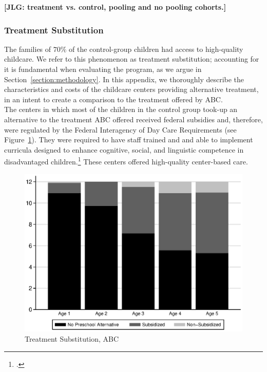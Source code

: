 \noindent \textbf{[JLG: treatment vs. control, pooling and no pooling cohorts.]}\\

\subsubsection{Treatment Substitution}

\noindent The families of $70\%$ of the control-group children had access to high-quality childcare. We refer to this phenomenon as treatment substitution; accounting for it is fundamental when evaluating the program, as we argue in Section~\ref{section:methodology}. In this appendix, we thoroughly describe the characteristics and costs of the childcare centers providing alternative treatment, in an intent to create a comparison to the treatment offered by ABC.\\

\noindent The centers in which most of the children in the control group took-up an alternative to the treatment ABC offered received federal subsidies and, therefore, were regulated by the Federal Interagency of Day Care Requirements (see Figure~\ref{fig:ccabc}). They were required to have staff trained and and able to implement curricula designed to enhance cognitive, social, and linguistic competence in disadvantaged children.\footnote{\citet{Burchinal_etal_1989_CD_Daycare-Pre-K-Dev}.} These centers offered high-quality center-based care.

\begin{center}
	\begin{figure}[H]
		\caption{Treatment Substitution, ABC} \label{fig:ccabc}
		\centering
		\includegraphics[width=.9\columnwidth]{output/blackwhite_CCnumber.eps}
	\end{figure}
\end{center}

